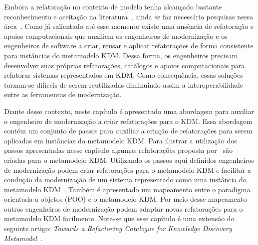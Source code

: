 Embora a refatoração no contexto de modelo tenha alcançado bastante reconhecimento e aceitação na literatura~\cite{Moghadam_2012, Maneerat_2011, Fourati_2011, Einarsson_2012, Steimann_2015, Akiyama_2011, Jensen_2010, Arendt_2012, Millan_2009, Tom_2008_2008}, ainda se faz necessário pesquisas nessa área~\cite{durelli_systematic_mapping, revisao_sistematica_uml_refactoring}. Como já salientado até esse momento existe uma ausência de refatoração e apoios computacionais que auxiliem os engenheiros de modernização e os engenheiros de software a criar, reusar e aplicar refatorações de forma consistente para instâncias do metamodelo KDM. Dessa forma, os engenheiros precisam desenvolver suas próprias refatorações, catálogos e apoios computacionais para refatorar sistemas representados em KDM. Como consequência, essas soluções tornam-se difíceis de serem reutilizadas diminuindo assim a interoperabilidade entre as ferramentas de modernização. 

Diante desse contexto, neste capítulo é apresentado uma abordagem para auxiliar o engenheiro de modernização a criar refatorações para o KDM. Essa abordagem contém um conjunto de passos para auxiliar a criação de refatorações para serem aplicadas em instâncias do metamodelo KDM. Para ilustrar a utilização dos passos apresentadas nesse capítulo algumas refatorações proposta por~ são criadas para o metamodelo KDM. Utilizando os passos aqui definidos engenheiros de modernização podem criar refatorações para o metamodelo KDM e facilitar a condução da modernização de um sistema representado como uma instância do metamodelo KDM~\cite{durelli_catalogo, durelli_VEM_ferramenta}. Também é apresentado um mapeamento entre o paradigma orientada a objetos (POO) e o metamodelo KDM. Por meio desse mapeamento outros engenheiros de modernização podem adaptar novas refatorações para o metamodelo KDM facilmente. Nota-se que esse capítulo é uma extensão do seguinte artigo: \textit{Towards a Refactoring Catalogue for Knowledge Discovery Metamodel}~\cite{durelli_catalogo}.




